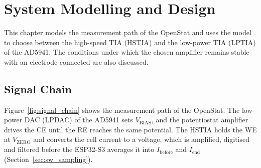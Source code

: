 \chapter{System Modelling and Design}
\label{chap:modeling}

This chapter models the measurement path of the OpenStat and uses the model to choose between the high-speed TIA (HSTIA) and the low-power TIA (LPTIA) of the AD5941. The conditions under which the chosen amplifier remains stable with an electrode connected are also discussed.


\section{Signal Chain}
\label{sec:signal_chain}

Figure~\ref{fig:signal_chain} shows the measurement path of the OpenStat.
The low-power DAC (LPDAC) of the AD5941 sets $V_\mathrm{BIAS}$, and the potentiostat amplifier drives the CE until the RE reaches the same
potential. The HSTIA holds the WE at $V_\mathrm{ZERO}$ and
converts the cell current to a voltage, which is amplified, digitised and
filtered before the ESP32-S3 averages it into $I_\mathrm{before}$ and
$I_\mathrm{end}$ (Section~\ref{sec:sw_sampling}). 


